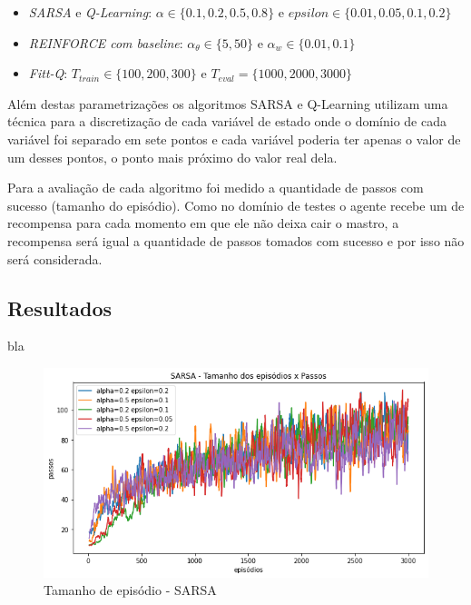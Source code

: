 \documentclass[letterpaper]{article}
\begin{document}
\begin{itemize}
  \item \textit{SARSA} e \textit{Q-Learning}: $\alpha \in \{ 0.1, 0.2, 0.5, 0.8 \}$ e $epsilon \in \{ 0.01, 0.05, 0.1, 0.2 \}$
  \item \textit{REINFORCE com baseline}: $\alpha_{\theta} \in \{ 5, 50 \}$ e $\alpha_{w} \in \{ 0.01, 0.1 \}$
  \item \textit{Fitt-Q}: $T_{train} \in \{ 100, 200, 300 \} $ e $T_{eval} = \{ 1000, 2000, 3000 \}$
\end{itemize}

Além destas parametrizações os algoritmos SARSA e Q-Learning utilizam uma técnica para a discretização de cada variável de estado onde o domínio de cada variável foi separado em sete pontos e cada variável poderia ter apenas o valor de um desses pontos, o ponto mais próximo do valor real dela. 


Para a avaliação de cada algoritmo foi medido a quantidade de passos com sucesso (tamanho do episódio). Como no domínio de testes o agente recebe um de recompensa para cada momento em que ele não deixa cair o mastro, a recompensa será igual a quantidade de passos tomados com sucesso e por isso não será considerada.

\subsection{Resultados}

bla

\begin{figure}[t]
  \centering
  \includegraphics[width=0.9\columnwidth]{exp-sarsa-episodes}
  \caption{Tamanho de episódio - SARSA}
  \label{fig:exp-sarsa-episodes}
\end{figure}
\end{document}
